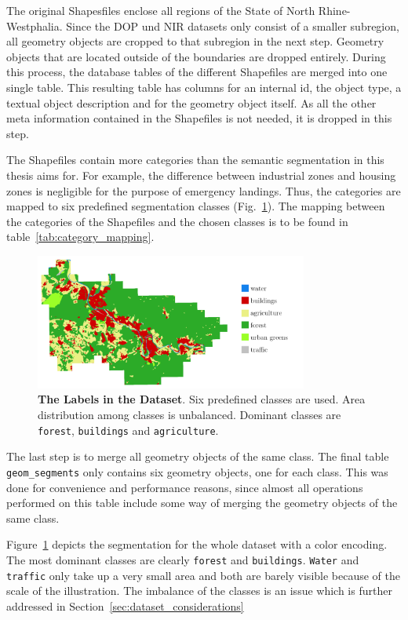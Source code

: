 The original Shapesfiles enclose all regions of the State of North Rhine-Westphalia. Since the DOP und NIR datasets only consist of a smaller subregion, all geometry objects are cropped to that subregion in the next step. Geometry objects that are located outside of the boundaries are dropped entirely. During this process, the database tables of the different Shapefiles are merged into one single table. This resulting table has columns for an internal id, the object type, a textual object description and for the geometry object itself. As all the other meta information contained in the Shapefiles is not needed, it is dropped in this step.

The Shapefiles contain more categories than the semantic segmentation in this thesis aims for. For example, the difference between industrial zones and housing zones is negligible for the purpose of emergency landings. Thus, the categories are mapped to six predefined segmentation classes (Fig.~\ref{fig:dop_label_all}). The mapping between the categories of the Shapefiles and the chosen classes is to be found in table~\ref{tab:category_mapping}.

\begin{figure}[h]
    \centering
    \includegraphics[width=0.8\textwidth]{images/dop_label_all}
    \caption[The Labels in the Dataset]
    {\textbf{The Labels in the Dataset}. Six predefined classes are used. Area distribution among classes is unbalanced. Dominant classes are \texttt{forest}, \texttt{buildings} and \texttt{agriculture}.}
    \label{fig:dop_label_all}
\end{figure}

The last step is to merge all geometry objects of the same class. The final table \texttt{geom\_segments} only contains six geometry objects, one for each class. This was done for convenience and performance reasons, since almost all operations performed on this table include some way of merging the geometry objects of the same class.

Figure~\ref{fig:dop_label_all} depicts the segmentation for the whole dataset with a color encoding. The most dominant classes are clearly \texttt{forest} and \texttt{buildings}. \texttt{Water} and \texttt{traffic} only take up a very small area and both are barely visible because of the scale of the illustration. The imbalance of the classes is an issue which is further addressed in Section~\ref{sec:dataset_considerations}

